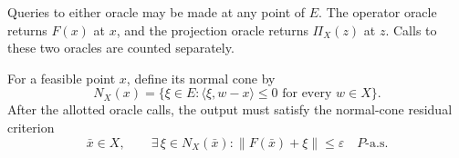 \documentclass[10pt]{article}
\theoremstyle{definition}
\begin{document}
Queries to either oracle may be made at any point of $E$. The operator oracle returns $F(x)$ at $x$, and the projection oracle returns $\Pi_X(z)$ at $z$. Calls to these two oracles are counted separately.

For a feasible point $x$, define its normal cone by
\[
N_X(x)=\{\xi\in E:\langle\xi,w-x\rangle\leq0
\text{ for every }w\in X\}.
\]
After the allotted oracle calls, the output must satisfy the normal-cone residual criterion
\[
\bar{x}\in X,
\qquad
\exists\,\xi\in N_X(\bar{x}):
\|F(\bar{x})+\xi\|\leq\varepsilon
\quad P\text{-a.s.}
\]
\end{document}
